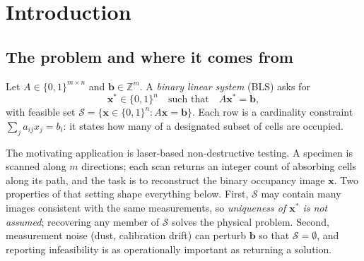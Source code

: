 \documentclass[12pt]{article}
\begin{document}
\begin{abstract}
pass at $1.6$\,ms, roughly $20\times$ cheaper, with equal or better hit rate. Learning's role is therefore \emph{amortization of expensive deduction}, not discovery of inaccessible information --- an instance of amortized optimization \citep{amos2023tutorial}, and the same role branching imitation plays in mixed-integer programming \citep{gasse2019exact}. Fourth, used as branching guidance this yields a median $2.71\times$ speedup over LP-based guidance at $21\times60$ (sign test $p=0.019$), a $6.2\times$ reduction in nodes, and a solve-rate increase from $90.0\%$ to $100\%$ within a 600\,s budget; in the deployed cascade, where lattice reduction runs first, coverage of that stage falls from $30/30$ at $n=25$ to $16/30$ at $n=60$ and guidance lifts the end-to-end rate from $93.3\%$ to $100\%$. Controlling $|\mathcal{S}|$ across sizes --- previously confounded by a factor of ten --- removes an artifact that had been misread as transfer failure: a model trained only at $10\times25$ is statistically indistinguishable from one trained at the target size when both are evaluated at $21\times60$ ($15/30$ instances faster, total time differing by $0.4\%$). All instance generators, exact-marginal labels, checkpoints and per-instance results are released with the code.
\end{abstract}

\section{Introduction}
\label{sec:intro}

\subsection{The problem and where it comes from}

Let $A\in\{0,1\}^{m\times n}$ and $\mathbf{b}\in\mathbb{Z}^m$. A \emph{binary linear system} (BLS) asks for
\begin{equation}
\mathbf{x}^\ast \in \{0,1\}^n \quad\text{such that}\quad A\mathbf{x}^\ast=\mathbf{b},
\label{eq:bls}
\end{equation}
with feasible set $\mathcal{S}=\{\mathbf{x}\in\{0,1\}^n: A\mathbf{x}=\mathbf{b}\}$. Each row is a cardinality constraint $\sum_{j} a_{ij}x_j=b_i$: it states how many of a designated subset of cells are occupied.

The motivating application is laser-based non-destructive testing. A specimen is scanned along $m$ directions; each scan returns an integer count of absorbing cells along its path, and the task is to reconstruct the binary occupancy image $\mathbf{x}$. Two properties of that setting shape everything below. First, $\mathcal{S}$ may contain many images consistent with the same measurements, so \emph{uniqueness of $\mathbf{x}^*$ is not assumed}; recovering any member of $\mathcal{S}$ solves the physical problem. Second, measurement noise (dust, calibration drift) can perturb $\mathbf{b}$ so that $\mathcal{S}=\emptyset$, and reporting infeasibility is as operationally important as returning a solution.
\end{document}
